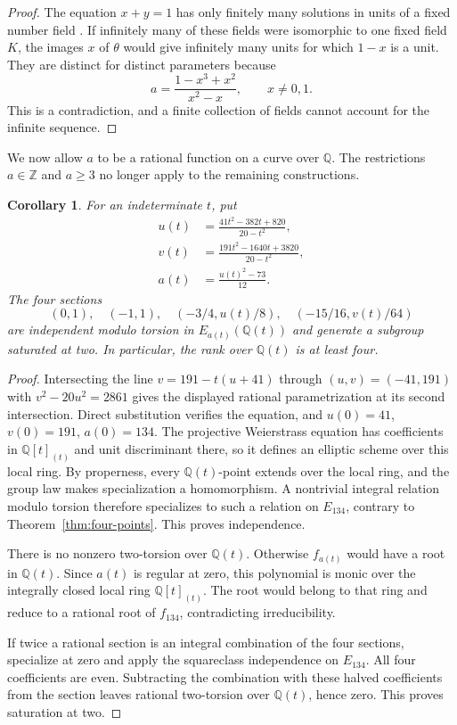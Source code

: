 \documentclass[draft]{publmathdeb}
\newtheorem{corollary}[theorem]{Corollary}
\theoremstyle{remark}
\numberwithin{equation}{section}
\newcommand{\Q}{\mathbb Q}
\newcommand{\Z}{\mathbb Z}
\begin{document}
\begin{proof}
  The equation $x+y=1$ has only finitely many solutions in units of a fixed number field \cite[Theorem IX.4.1]{Silverman2009}. If infinitely many of these fields were isomorphic to one fixed field $K$, the images $x$ of $\theta$ would give infinitely many units for which $1-x$ is a unit. They are distinct for distinct parameters because
  \[
    a=\frac{1-x^3+x^2}{x^2-x},\qquad x\ne0,1.
  \]
  This is a contradiction, and a finite collection of fields cannot account for the infinite sequence.
\end{proof}

We now allow $a$ to be a rational function on a curve over $\Q$. The restrictions $a\in\Z$ and $a\geq3$ no longer apply to the remaining constructions.

\begin{corollary}\label{cor:rational-family}
  For an indeterminate $t$, put
  \begin{align*}
    u(t) & =\frac{41t^2-382t+820}{20-t^2},    \\
    v(t) & =\frac{191t^2-1640t+3820}{20-t^2}, \\
    a(t) & =\frac{u(t)^2-73}{12}.
  \end{align*}
  The four sections
  \[
    (0,1),\quad(-1,1),\quad(-3/4,u(t)/8),\quad(-15/16,v(t)/64)
  \]
  are independent modulo torsion in $E_{a(t)}(\Q(t))$ and generate a subgroup saturated at two. In particular, the rank over $\Q(t)$ is at least four.
\end{corollary}

\begin{proof}
  Intersecting the line $v=191-t(u+41)$ through $(u,v)=(-41,191)$ with $v^2-20u^2=2861$ gives the displayed rational parametrization at its second intersection. Direct substitution verifies the equation, and $u(0)=41$, $v(0)=191$, $a(0)=134$. The projective Weierstrass equation has coefficients in $\Q[t]_{(t)}$ and unit discriminant there, so it defines an elliptic scheme over this local ring. By properness, every $\Q(t)$-point extends over the local ring, and the group law makes specialization a homomorphism. A nontrivial integral relation modulo torsion therefore specializes to such a relation on $E_{134}$, contrary to Theorem~\ref{thm:four-points}. This proves independence.

  There is no nonzero two-torsion over $\Q(t)$. Otherwise $f_{a(t)}$ would have a root in $\Q(t)$. Since $a(t)$ is regular at zero, this polynomial is monic over the integrally closed local ring $\Q[t]_{(t)}$. The root would belong to that ring and reduce to a rational root of $f_{134}$, contradicting irreducibility.

  If twice a rational section is an integral combination of the four sections, specialize at zero and apply the squareclass independence on $E_{134}$. All four coefficients are even. Subtracting the combination with these halved coefficients from the section leaves rational two-torsion over $\Q(t)$, hence zero. This proves saturation at two.
\end{proof}
\end{document}
